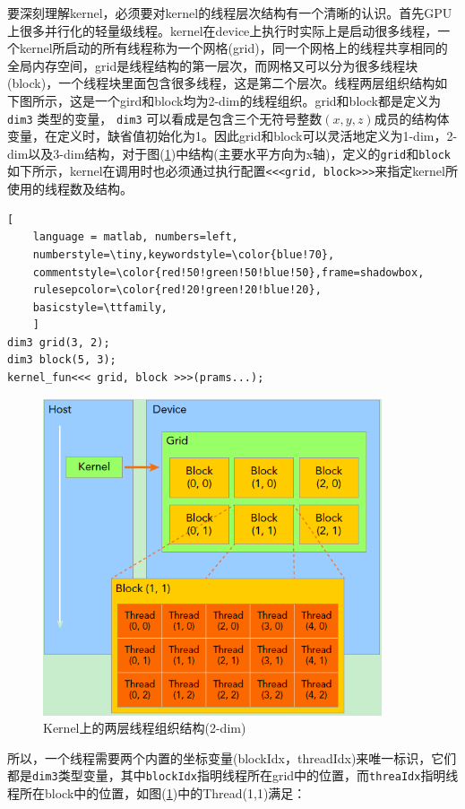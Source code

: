 \documentclass[UTF-8, a4paper, 12pt]{ctexart}
\begin{document}
要深刻理解kernel，必须要对kernel的线程层次结构有一个清晰的认识。首先GPU上很多并行化的轻量级线程。kernel在device上执行时实际上是启动很多线程，一个kernel所启动的所有线程称为一个网格(grid)，同一个网格上的线程共享相同的全局内存空间，grid是线程结构的第一层次，而网格又可以分为很多线程块(block)，一个线程块里面包含很多线程，这是第二个层次。线程两层组织结构如下图所示，这是一个gird和block均为2-dim的线程组织。grid和block都是定义为
\colorbox[gray]{0.9}{\texttt{dim3}}
类型的变量，
\colorbox[gray]{0.9}{\texttt{dim3}}
可以看成是包含三个无符号整数$(x,y,z)$成员的结构体变量，在定义时，缺省值初始化为1。因此grid和block可以灵活地定义为1-dim，2-dim以及3-dim结构，对于图(\ref{f13})中结构(主要水平方向为x轴)，定义的\colorbox[gray]{0.9}{\texttt{grid}}和\colorbox[gray]{0.9}{\texttt{block}}如下所示，kernel在调用时也必须通过执行配置\colorbox[gray]{0.9}{\texttt{<<<grid, block>>>}}来指定kernel所使用的线程数及结构。
\begin{lstlisting}[
	language = matlab, numbers=left, 
	numberstyle=\tiny,keywordstyle=\color{blue!70},
	commentstyle=\color{red!50!green!50!blue!50},frame=shadowbox,
	rulesepcolor=\color{red!20!green!20!blue!20},
	basicstyle=\ttfamily,
	]
dim3 grid(3, 2);
dim3 block(5, 3);
kernel_fun<<< grid, block >>>(prams...);
\end{lstlisting}

\begin{figure}[htbp]
    \centering
    \includegraphics[width=10cm]{fig/f13.png}
    \caption{Kernel上的两层线程组织结构(2-dim)}
    \label{f13}
\end{figure}

所以，一个线程需要两个内置的坐标变量(blockIdx，threadIdx)来唯一标识，它们都是\colorbox[gray]{0.9}{\texttt{dim3}}类型变量，其中\colorbox[gray]{0.9}{\texttt{blockIdx}}指明线程所在grid中的位置，而\colorbox[gray]{0.9}{\texttt{threaIdx}}指明线程所在block中的位置，如图(\ref{f13})中的Thread(1,1)满足：
\end{document}

